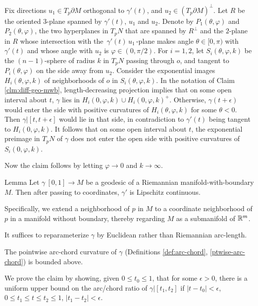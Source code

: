 Fix directions $u_1\in T_p\partial M$  orthogonal to $\gamma'(t)$, and $u_2\in  (T_p\partial M)^\perp$.  Let $R$ be the oriented $3$-plane  spanned by $\gamma'(t)$, $u_1$ and $u_2$.  Denote by $P_1(\theta,\varphi)$ and $P_2(\theta,\varphi)$, the two hyperplanes in $T_pN$ that are spanned by $R^\perp$ and  the $2$-plane in $R$ whose intersection with  the $\,\gamma'(t)\,u_1\,$-plane makes angle $\theta\in [0,\pi)$ with $\gamma'(t)$ and whose angle with $u_2$ is $\varphi\in (0,\pi/2)$.
For $i=1,2$, let $S_i(\theta, \varphi, k)$ be the $(n-1)$-sphere of radius $k$ in $T_pN$ passing through $o$, and  tangent to $P_i(\theta,\varphi)$ on the side away from $u_2$.  Consider the exponential images $H_i(\theta, \varphi, k)$  of  neighborhoods of $o$ in $S_i(\theta, \varphi, k)$.  
In the notation of Claim \ref{clm:diff-geo-mwb}, length-decreasing projection implies that on some open interval about $t$, $\gamma$ lies in $H_i(0, \varphi, k)\cup H_i(0, \varphi, k)^+$.  Otherwise, $\gamma(t+\epsilon)$ would enter the side with positive curvatures of $H_i(\theta, \varphi, k)$ for some $\theta<0$.  Then $\gamma|[t, t+\epsilon]$ would lie in that side, in contradiction to $\gamma'(t)$ being tangent to $H_i(0, \varphi, k)$.  It follows that on some open interval about $t$, the exponential preimage in $T_pN$ of $\gamma$  does not enter the open side with positive curvatures of $S_i(0,\varphi, k)$.

Now the claim follows by letting $\varphi\to 0$ and $k\to\infty$.
\qeds

\begin{thm}{Lemma}\label{lem:abs-cont}
Let $\gamma\:[0,1]\to M$ be a geodesic of a Riemannian manifold-with-boundary $M$. Then after passing to coordinates, 
$\gamma'$  is  Lipschitz continuous.  
\end{thm}

Specifically, we extend a neighborhood of $p$ in $M$ to a coordinate neighborhood of $p$ in a manifold without boundary, thereby  regarding $M$ as a submanifold of $\mathbb{R}^m$.

It suffices to reparameterize $\gamma$ by Euclidean rather than Riemannian arc-length. 

\begin{clm}{}\label{clm:pointwise-k-bound}
The pointwise arc-chord curvature  of $\gamma$ (Definitions \ref{def:arc-chord}, \ref{ptwise-arc-chord}) is bounded above.
\end{clm}

We prove the claim by showing,  given $0\le t_0\le 1$,  that for some  $\epsilon>0$, there is a uniform upper bound on the arc/chord ratio of $\gamma|[t_1,t_2]$ if  $|t-t_0|<\epsilon$, $0\le t_1\le t\le t_2\le 1$, $|t_1-t_2|<\epsilon$. 

